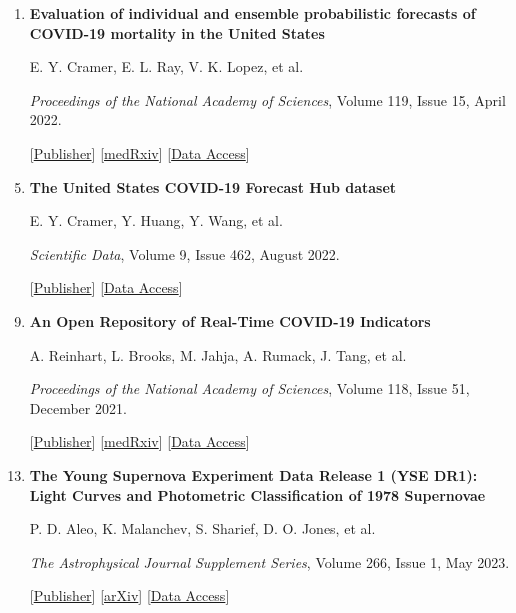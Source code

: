 \documentclass[letterpaper,10pt]{extarticle}
\begin{document}
\begin{enumerate}[leftmargin=0.6cm, itemsep=-0.05cm]
\vspace{0.4cm}

\item {\bf Evaluation of individual and ensemble probabilistic forecasts of COVID-19 mortality in the United States} 
\item[] E. Y. Cramer, E. L. Ray, V. K. Lopez, et al.
\item[] {\it Proceedings of the National Academy of Sciences}, Volume 119, Issue 15, April 2022.
\item[] [\href{https://www.pnas.org/doi/10.1073/pnas.2113561119}{Publisher}] [\href{https://www.medrxiv.org/content/10.1101/2021.02.03.21250974v3}{medRxiv}] [\href{https://covid19forecasthub.org/}{Data Access}]

\vspace{0.5cm}

\item {\bf The United States COVID-19 Forecast Hub dataset} 
\item[] E. Y. Cramer, Y. Huang, Y. Wang, et al.
\item[] {\it Scientific Data}, Volume 9, Issue 462, August 2022.
\item[] [\href{https://doi.org/10.1038/s41597-022-01517-w}{Publisher}] [\href{https://covid19forecasthub.org/}{Data Access}]

\vspace{0.5cm}

\item {\bf An Open Repository of Real-Time COVID-19 Indicators} 
\item[] A. Reinhart, L. Brooks, M. Jahja, A. Rumack, J. Tang, et al.
\item[] {\it Proceedings of the National Academy of Sciences}, Volume 118, Issue 51, December 2021.
\item[] [\href{https://doi.org/10.1073/pnas.2111452118}{Publisher}]
[\href{https://www.medrxiv.org/content/10.1101/2021.07.12.21259660v2}{medRxiv}]
[\href{https://cmu-delphi.github.io/delphi-epidata/api/covidcast.html}{Data Access}]

\vspace{0.5cm}

\item {\bf The Young Supernova Experiment Data Release 1 (YSE DR1): Light Curves and Photometric Classification of 1978 Supernovae}
\item[] P. D. Aleo, K. Malanchev, S. Sharief, D. O. Jones, et al.
\item[] {\it The Astrophysical Journal Supplement Series}, Volume 266, 
Issue 1, May 2023. 
\item[] [\href{https://doi.org/10.3847/1538-4365/acbfba}{Publisher}] [\href{https://arxiv.org/abs/2211.07128}{arXiv}] [\href{https://zenodo.org/record/7317476#.Y_8-n-zP1DY}{Data Access}]


\end{enumerate}
\end{document}
